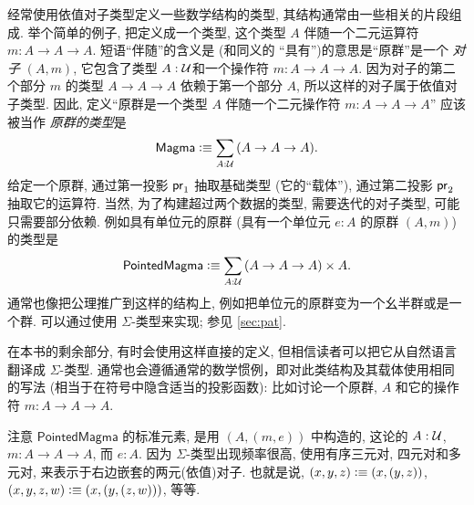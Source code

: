 经常使用依值对子类型定义一些数学结构的类型, 其结构通常由一些相关的片段组成.
举个简单的例子, 把定义成一个类型, 这个类型 $A$ 伴随一个二元运算符 $m:A\to A\to A$.
短语``伴随''的含义是 (和同义的 ``具有'')的意思是``原群''是一个 \emph{对子} $(A,m)$, 它包含了类型 $A:\mathcal{U}$和一个操作符 $m:A\to A\to A$.
因为对子的第二个部分 $m$ 的类型 $A\to A\to A$ 依赖于第一个部分 $A$, 所以这样的对子属于依值对子类型.
因此, 定义``原群是一个类型 $A$ 伴随一个二元操作符 $m:A\to A\to A$'' 应该被当作 \emph{原群的类型}是
\[
    \mathsf{Magma} \defeq \sm{A:\UU} (A\to A\to A).
\]
给定一个原群, 通过第一投影 $\mathsf{pr}_{1}$ 抽取基础类型 (它的``载体''), 通过第二投影 $\mathsf{pr}_{2}$ 抽取它的运算符.
当然, 为了构建超过两个数据的类型, 需要迭代的对子类型, 可能只需要部分依赖.
例如具有单位元的原群 (具有一个单位元 $e:A$ 的原群 $(A,m)$) 的类型是
\[
    \mathsf{PointedMagma} \defeq \sm{A:\UU} (A\to A\to A) \times A.
\]
通常也像把公理推广到这样的结构上, 例如把单位元的原群变为一个幺半群或是一个群.
可以通过使用 $\Sigma$-类型来实现;
参见 \cref{sec:pat}.

在本书的剩余部分, 有时会使用这样直接的定义, 但相信读者可以把它从自然语言翻译成 $\Sigma$-类型.
通常也会遵循通常的数学惯例，即对此类结构及其载体使用相同的写法 (相当于在符号中隐含适当的投影函数): 比如讨论一个原群, $A$ 和它的操作符 $m:A\to A\to A$.

注意 $\mathsf{PointedMagma}$ 的标准元素, 是用 $(A,(m,e))$ 中构造的, 这论的 $A:\mathcal{U}$, $m:A\to A\to A$, 而 $e:A$.
因为 $\Sigma$-类型出现频率很高, 使用有序三元对, 四元对和多元对, 来表示于右边嵌套的两元(依值)对子.
也就是说, $(x,y,z) \vcentcolon\equiv (x,(y,z))$, $(x,y,z,w)\vcentcolon\equiv (x,(y,(z,w)))$, 等等.

%